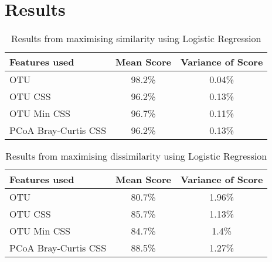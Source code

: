 \chapter{Results}

\ifpdf
    \graphicspath{{Chapter3/Figs/Raster/}{Chapter3/Figs/PDF/}{Chapter3/Figs/}}
\else
    \graphicspath{{Chapter3/Figs/Vector/}{Chapter3/Figs/}}
\fi
\begin{table}
\caption{Results from maximising similarity using Logistic Regression}
\centering
\label{table:similarity}
\begin{tabular}{l c  c}
\hline 
Features used & Mean Score & Variance of Score \\ 
 
\hline
OTU & 98.2\% & 0.04\%   \\
OTU CSS & 96.2\% & 0.13\%   \\
OTU Min CSS & 96.7\% & 0.11\%   \\
PCoA Bray-Curtis CSS &96.2\% & 0.13\%   \\

\hline 
\end{tabular}
\end{table}


\begin{table}[h]
\caption{Results from maximising dissimilarity using Logistic Regression}
\centering
\label{table:dissimilarity}
\begin{tabular}{l c  c}
\hline 
Features used & Mean Score & Variance of Score \\ 
 
\hline
OTU & 80.7\% & 1.96\%   \\
OTU CSS & 85.7\% & 1.13\%   \\
OTU Min CSS & 84.7\% & 1.4\%   \\
PCoA Bray-Curtis CSS &88.5\% & 1.27\%   \\

\hline 
\end{tabular}
\end{table} 
